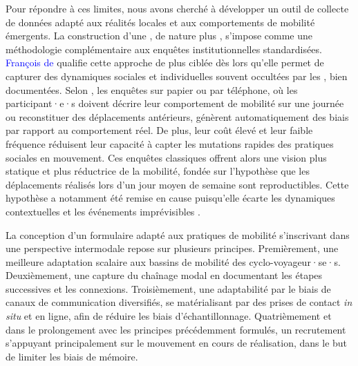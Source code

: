 \begin{refsegment}
Pour répondre à ces limites, nous avons cherché à développer un outil de collecte de données adapté aux réalités locales et aux comportements de mobilité émergents. La construction d'une , de nature plus  \textcolor{blue}{\autocite[42]{singly_questionnaire_2016}}, s'impose comme une méthodologie complémentaire aux enquêtes institutionnelles standardisées. \textcolor{blue}{François de} \textcolor{blue}{\textcite[42]{singly_questionnaire_2016}} qualifie cette approche de plus ciblée dès lors qu'elle permet de capturer des dynamiques sociales et individuelles souvent occultées par les , bien documentées. Selon \textcolor{blue}{\textcite[8]{armoogum_rapport_2018}}, les enquêtes sur papier ou par téléphone, où les participant·e·s doivent décrire leur comportement de mobilité sur une journée ou reconstituer des déplacements antérieurs, génèrent automatiquement des biais par rapport au comportement réel. De plus, leur coût élevé et leur faible fréquence réduisent leur capacité à capter les mutations rapides des pratiques sociales en mouvement. Ces enquêtes classiques offrent alors une vision plus statique et plus réductrice de la mobilité, fondée sur l'hypothèse que les déplacements réalisés lors d'un jour moyen de semaine sont reproductibles. Cette hypothèse a notamment été remise en cause puisqu'elle écarte les dynamiques contextuelles et les événements imprévisibles \textcolor{blue}{\autocite{madre_dynamiser_2004}}.%

La conception d'un formulaire adapté aux pratiques de mobilité s'inscrivant dans une perspective intermodale repose sur plusieurs principes. Premièrement, une meilleure adaptation scalaire aux bassins de mobilité des cyclo-voyageur·se·s. Deuxièmement, une capture du chaînage modal en documentant les étapes successives et les connexions. Troisièmement, une adaptabilité par le biais de canaux de communication diversifiés, se matérialisant par des prises de contact \textsl{in situ} et en ligne, afin de réduire les biais d'échantillonnage. Quatrièmement et dans le prolongement avec les principes précédemment formulés, un recrutement s'appuyant principalement sur le mouvement en cours de réalisation, dans le but de limiter les biais de mémoire.%


\end{refsegment}
